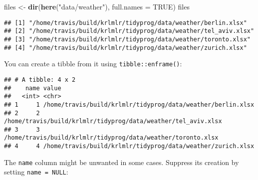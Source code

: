 \documentclass[]{book}
\newenvironment{Shaded}{\begin{snugshade}}{\end{snugshade}}
\newcommand{\DataTypeTok}[1]{\textcolor[rgb]{0.13,0.29,0.53}{#1}}
\newcommand{\DecValTok}[1]{\textcolor[rgb]{0.00,0.00,0.81}{#1}}
\newcommand{\KeywordTok}[1]{\textcolor[rgb]{0.13,0.29,0.53}{\textbf{#1}}}
\newcommand{\NormalTok}[1]{#1}
\newcommand{\OperatorTok}[1]{\textcolor[rgb]{0.81,0.36,0.00}{\textbf{#1}}}
\newcommand{\OtherTok}[1]{\textcolor[rgb]{0.56,0.35,0.01}{#1}}
\newcommand{\StringTok}[1]{\textcolor[rgb]{0.31,0.60,0.02}{#1}}
\begin{document}
\begin{Shaded}
\begin{Highlighting}[]
\NormalTok{files <-}\StringTok{ }\KeywordTok{dir}\NormalTok{(}\KeywordTok{here}\NormalTok{(}\StringTok{"data/weather"}\NormalTok{), }\DataTypeTok{full.names =} \OtherTok{TRUE}\NormalTok{)}
\NormalTok{files}
\end{Highlighting}
\end{Shaded}

\begin{verbatim}
## [1] "/home/travis/build/krlmlr/tidyprog/data/weather/berlin.xlsx"  
## [2] "/home/travis/build/krlmlr/tidyprog/data/weather/tel_aviv.xlsx"
## [3] "/home/travis/build/krlmlr/tidyprog/data/weather/toronto.xlsx" 
## [4] "/home/travis/build/krlmlr/tidyprog/data/weather/zurich.xlsx"
\end{verbatim}

You can create a tibble from it using \texttt{tibble::enframe()}:

\begin{Shaded}
\end{Shaded}

\begin{verbatim}
## # A tibble: 4 x 2
##    name value                                                        
##   <int> <chr>                                                        
## 1     1 /home/travis/build/krlmlr/tidyprog/data/weather/berlin.xlsx  
## 2     2 /home/travis/build/krlmlr/tidyprog/data/weather/tel_aviv.xlsx
## 3     3 /home/travis/build/krlmlr/tidyprog/data/weather/toronto.xlsx 
## 4     4 /home/travis/build/krlmlr/tidyprog/data/weather/zurich.xlsx
\end{verbatim}

The \texttt{name} column might be unwanted in some cases. Suppress its creation by setting \texttt{name\ =\ NULL}:

\begin{Shaded}
\end{Shaded}
\end{document}
